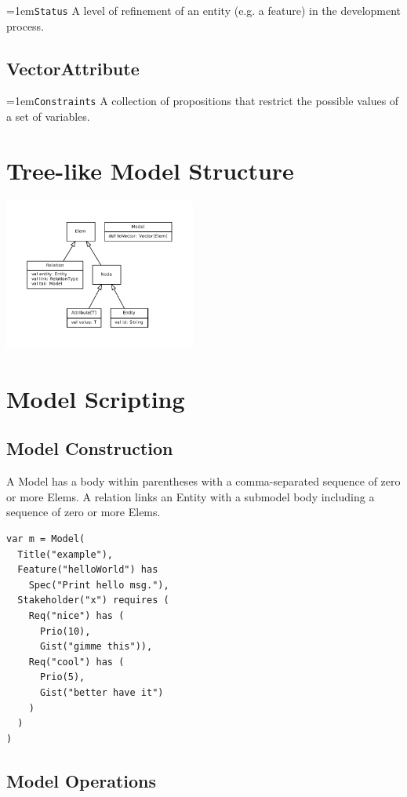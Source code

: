 \documentclass[9pt,a4paper,oneside]{report}
\begin{document}
\begin{multicols*}{4}
\hangindent=1em\lstinline+Status+ A level of refinement of an entity (e.g. a feature) in the development process. 

\subsection*{VectorAttribute}

\hangindent=1em\lstinline+Constraints+ A collection of propositions that restrict the possible values of a set of variables.

\vspace{2em}
\section*{Tree-like Model Structure}

\includegraphics[width=6.3cm]{metamodel.pdf}

\vspace{2em}
\section*{Model Scripting}
\subsection*{Model Construction}
A Model has a body within parentheses with a comma-separated sequence of zero or more Elems. A relation links an Entity with a submodel body including a sequence of zero or more Elems.
\begin{lstlisting}
var m = Model(  
  Title("example"), 
  Feature("helloWorld") has 
    Spec("Print hello msg."),
  Stakeholder("x") requires (
    Req("nice") has (
      Prio(10),
      Gist("gimme this")),
    Req("cool") has (
      Prio(5),
      Gist("better have it")
    )
  )
)   
\end{lstlisting}

\subsection*{Model Operations}


\end{multicols*}
\end{document}
